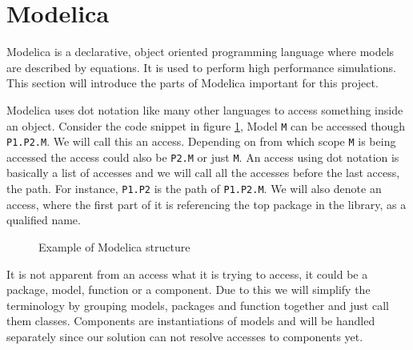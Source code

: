 \documentclass{cslthse-msc}
\begin{document}
\section{Modelica}
Modelica is a declarative, object oriented programming language where models are described by equations. It is used to perform high performance simulations. This section will introduce the parts of Modelica important for this project.

Modelica uses dot notation like many other languages to access something inside an object. Consider the code snippet in figure \ref{fig:modelicaExample}, Model \texttt{M} can be accessed though \texttt{P1.P2.M}. We will call this an access. Depending on from which scope \texttt{M} is being accessed the access could also be \texttt{P2.M} or just \texttt{M}. An access using dot notation is basically a list of accesses and we will call all the accesses before the last access, the path. For instance, \texttt{P1.P2} is the path of \texttt{P1.P2.M}. We will also denote an access, where the first part of it is referencing the top package in the library, as a qualified name.

\begin{figure}[!htbp]
    \centering
    \qquad
    \subfloat{\raisebox{3.2 cm}{}}
    \caption{Example of Modelica structure}
    \label{fig:modelicaExample}
\end{figure}

It is not apparent from an access what it is trying to access, it could be a package, model, function or a component. Due to this we will simplify the terminology by grouping models, packages and function together and just call them classes. Components are instantiations of models and will be handled separately since our solution can not resolve accesses to components yet.
\end{document}
